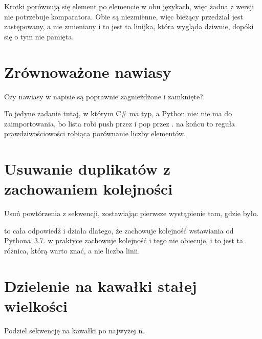\noindent
Krotki porównują się element po elemencie w obu językach, więc żadna z wersji nie potrzebuje komparatora. Obie są niezmienne, więc bieżący przedział jest zastępowany, a nie zmieniany \dash{} i to jest ta linijka, która wygląda dziwnie, dopóki się o tym nie pamięta.

\section{Zrównoważone nawiasy}
\label{sec:appD-balanced}

\noindent
Czy nawiasy w napisie są poprawnie zagnieżdżone i zamknięte?



\noindent
To jedyne zadanie tutaj, w którym C\# ma typ, a Python nie: nie ma  do zaimportowania, bo lista robi push przez  i pop przez .  na końcu to reguła prawdziwościowości robiąca porównanie liczby elementów.

\section{Usuwanie duplikatów z zachowaniem kolejności}
\label{sec:appD-dedupe}

\noindent
Usuń powtórzenia z sekwencji, zostawiając pierwsze wystąpienie tam, gdzie było.



\noindent
{} to cała odpowiedź i działa dlatego, że  zachowuje kolejność wstawiania od Pythona~3.7.  w praktyce zachowuje kolejność i tego nie obiecuje, i to jest ta różnica, którą warto znać, a nie liczba linii.

\section{Dzielenie na kawałki stałej wielkości}
\label{sec:appD-chunk}

\noindent
Podziel sekwencję na kawałki po najwyżej n.


